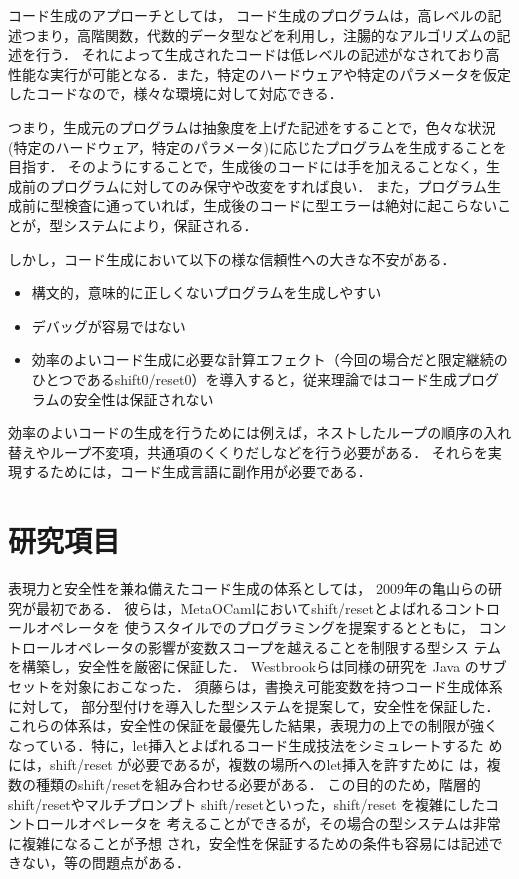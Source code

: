 \documentclass[10pt,a4j,xcolor=dvipsnames,twocolumn]{jarticle}
\theoremstyle{definition}
\begin{document}
コード生成のアプローチとしては，
コード生成のプログラムは，高レベルの記述つまり，高階関数，代数的データ型などを利用し，注腸的なアルゴリズムの記述を行う．
それによって生成されたコードは低レベルの記述がなされており高性能な実行が可能となる．また，特定のハードウェアや特定のパラメータを仮定したコードなので，様々な環境に対して対応できる．

つまり，生成元のプログラムは抽象度を上げた記述をすることで，色々な状況(特定のハードウェア，特定のパラメータ)に応じたプログラムを生成することを目指す．
そのようにすることで，生成後のコードには手を加えることなく，生成前のプログラムに対してのみ保守や改変をすれば良い．
また，プログラム生成前に型検査に通っていれば，生成後のコードに型エラーは絶対に起こらないことが，型システムにより，保証される．

しかし，コード生成において以下の様な信頼性への大きな不安がある．

\begin{itemize}
\item 構文的，意味的に正しくないプログラムを生成しやすい
\item デバッグが容易ではない
\item 効率のよいコード生成に必要な計算エフェクト（今回の場合だと限定継続のひとつであるshift0/reset0）を導入すると，従来理論ではコード生成プログラムの安全性は保証されない
\end{itemize}

効率のよいコードの生成を行うためには例えば，ネストしたループの順序の入れ替えやループ不変項，共通項のくくりだしなどを行う必要がある．
それらを実現するためには，コード生成言語に副作用が必要である．

\section{研究項目}
表現力と安全性を兼ね備えたコード生成の体系としては，
2009年の亀山らの研究\cite{Kameyama2009}が最初である．
彼らは，MetaOCamlにおいてshift/resetとよばれるコントロールオペレータを
使うスタイルでのプログラミングを提案するとともに，
コントロールオペレータの影響が変数スコープを越えることを制限する型シス
テムを構築し，安全性を厳密に保証した．
Westbrookら\cite{Westbrook}は同様の研究を Java のサブセットを対象におこなった．
須藤ら\cite{Sudo2014}は，書換え可能変数を持つコード生成体系に対して，
部分型付けを導入した型システムを提案して，安全性を保証した．
これらの体系は，安全性の保証を最優先した結果，表現力の上での制限が強く
なっている．特に，let挿入とよばれるコード生成技法をシミュレートするた
めには，shift/reset が必要であるが，複数の場所へのlet挿入を許すために
は，複数の種類のshift/resetを組み合わせる必要がある．
この目的のため，階層的shift/resetやマルチプロンプト
shift/resetといった，shift/reset を複雑にしたコントロールオペレータを
考えることができるが，その場合の型システムは非常に複雑になることが予想
され，安全性を保証するための条件も容易には記述できない，等の問題点がある．
\end{document}

